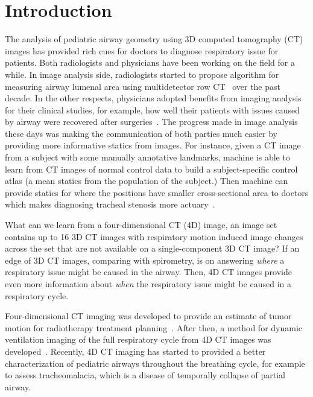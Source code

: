 \section{Introduction}
\label{sec:intro}

The analysis of pediatric airway geometry using 3D computed tomography (CT) images has provided rich cues for doctors to diagnose respiratory issue for patients.
Both radiologists and physicians have been working on the field for a while.
In image analysis side, radiologists started to propose algorithm for measuring airway lumenal area using multidetector row CT~\cite{nakano2002development} over the past decade.
In the other respects, physicians adopted benefits from imaging analysis for their clinical studies, for example, how well their patients with issues caused by airway were recovered after surgeries~\cite{abramson2011three}.
The progress made in image analysis these days was making the communication of both parties much easier by providing more informative statics from images.
For instance, given a CT image from a subject with some manually annotative landmarks, machine is able to learn from CT images of normal control data to build a subject-specific control atlas (a mean statics from the population of the subject.) 
Then machine can provide statics for where the positions have smaller cross-sectional area to doctors which makes diagnosing tracheal stenosis more actuary~\cite{hong2014statistical}.

What can we learn from a four-dimensional CT (4D) image, an image set contains up to 16 3D CT images with respiratory motion induced image changes across the set that are not available on a single-component 3D CT image?
If an edge of 3D CT images, comparing with spirometry, is on answering {\it where} a respiratory issue might be caused in the airway.
Then, 4D CT images provide even more information about {\it when} the respiratory issue might be caused in a respiratory cycle.

Four-dimensional CT imaging was developed to provide an estimate of tumor motion for radiotherapy treatment planning~\cite{ford2003respiration}.
After then, a method for dynamic ventilation imaging of the full respiratory cycle from 4D CT images was developed~\cite{guerrero2006dynamic}.
Recently, 4D CT imaging has started to provided a better characterization of pediatric airways throughout the breathing cycle, for example to assess tracheomalacia, which is a disease of temporally collapse of partial airway.

